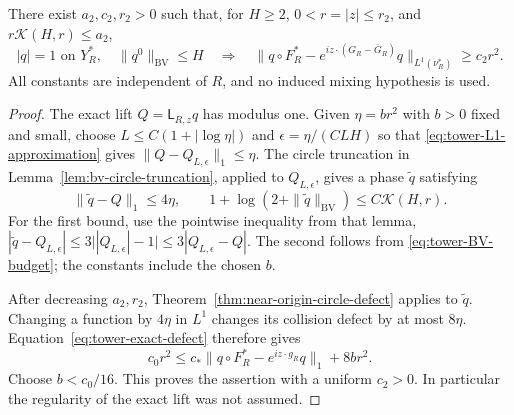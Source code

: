 \begin{theorem}
\label{thm:actual-return-circle-defect}
There exist $a_2,c_2,r_2>0$ such that, for $H\ge2$,
$0<r=|z|\le r_2$, and $r\mathcal K(H,r)\le a_2$,
\begin{equation}\label{eq:actual-return-circle-defect}
 |q|=1\text{ on }Y_R^*,\quad\|q^0\|_{\mathrm{BV}}\le H
 \quad\Longrightarrow\quad
 \|q\circ F_R^*-e^{iz\cdot(G_R-\bar G_R)}q\|_{L^1(\nu_R^*)}
                         \ge c_2r^2.
\end{equation}
All constants are independent of $R$, and no induced mixing hypothesis
is used.
\end{theorem}
\begin{proof}
The exact lift $Q=\mathsf L_{R,z}q$ has modulus one. Given
$\eta=b r^2$ with $b>0$ fixed and small, choose
$L\le C(1+|\log\eta|)$ and
$\epsilon=\eta/(C L H)$ so that
\eqref{eq:tower-L1-approximation} gives
$\|Q-Q_{L,\epsilon}\|_1\le\eta$.
The circle truncation in Lemma~\ref{lem:bv-circle-truncation}, applied
to $Q_{L,\epsilon}$, gives a phase $\widetilde q$ satisfying
\[
 \|\widetilde q-Q\|_1\le4\eta,\qquad
 1+\log(2+\|\widetilde q\|_{\mathrm{BV}})
                                     \le C\mathcal K(H,r).
\]
For the first bound, use the pointwise inequality from that lemma,
$|\widetilde q-Q_{L,\epsilon}|\le3\big||Q_{L,\epsilon}|-1\big|
\le3|Q_{L,\epsilon}-Q|$. The second follows from
\eqref{eq:tower-BV-budget}; the constants include the chosen $b$.

After decreasing $a_2,r_2$, Theorem~\ref{thm:near-origin-circle-defect}
applies to $\widetilde q$. Changing a function by $4\eta$ in $L^1$
changes its collision defect by at most $8\eta$.
Equation~\eqref{eq:tower-exact-defect} therefore gives
\[
 c_0r^2\le c_*\|q\circ F_R^*-e^{iz\cdot g_R}q\|_1+8br^2.
\]
Choose $b<c_0/16$. This proves the assertion with a uniform $c_2>0$.
In particular the regularity of the exact lift was not assumed.
\end{proof}

